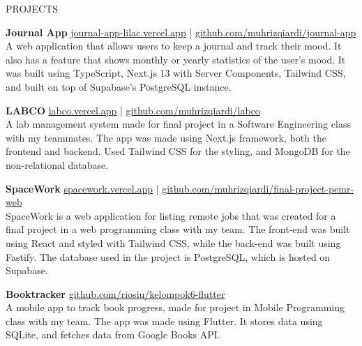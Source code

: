 \documentclass{resume}
\begin{document}
\begin{rSection}{PROJECTS}
\vspace{-1.25em}
\item \textbf{Journal App} {\hfill \href{https://journal-app-lilac.vercel.app/}{journal-app-lilac.vercel.app} | \href{https://github.com/muhrizqiardi/journal-app}{github.com/muhrizqiardi/journal-app}\\
A web application that allows users to keep a journal and track their mood. It also has a feature that shows monthly or yearly statistics of the user's mood. It was built using TypeScript, Next.js 13 with Server Components, Tailwind CSS, and built on top of Supabase's PostgreSQL instance.}
\item \textbf{LABCO} {\hfill \href{https://labco.vercel.app/}{labco.vercel.app} | \href{https://github.com/muhrizqiardi/labco}{github.com/muhrizqiardi/labco}\\
A lab management system made for final project in a Software Engineering class with my teammates. The app was made using Next.js framework, both the frontend and backend. Used Tailwind CSS for the styling, and MongoDB for the non-relational database.}
\item \textbf{SpaceWork} {\hfill \href{https://spacework.vercel.app/}{spacework.vercel.app} | \href{https://github.com/muhrizqiardi/final-project-pemr-web}{github.com/muhrizqiardi/final-project-pemr-web}\\
SpaceWork is a web application for listing remote jobs that was created for a final project in a web programming class with my team. The front-end was built using React and styled with Tailwind CSS, while the back-end was built using Fastify. The database used in the project is PostgreSQL, which is hosted on Supabase.}
\item \textbf{Booktracker} {\hfill\href{https://github.com/riosiu/kelompok6-flutter}{github.com/riosiu/kelompok6-flutter}\\
A mobile app to track book progress, made for project in Mobile Programming class with my team. The app was made using Flutter. It stores data using SQLite, and fetches data from Google Books API.}
\end{rSection} 
\end{document}
